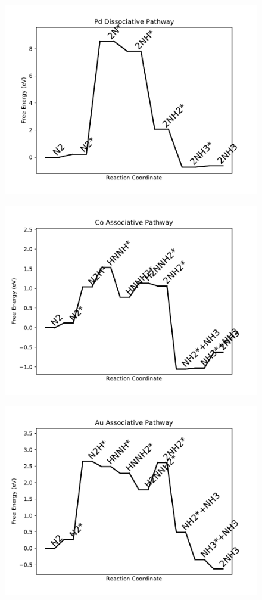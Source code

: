 \begin{figure}
\includegraphics[width=0.8\linewidth]{data/plots/Pd_dissociative.pdf}
\end{figure}

\begin{figure}
\includegraphics[width=0.8\linewidth]{data/plots/Co_associative.pdf}
\end{figure}

\begin{figure}
\includegraphics[width=0.8\linewidth]{data/plots/Au_associative.pdf}
\end{figure}

